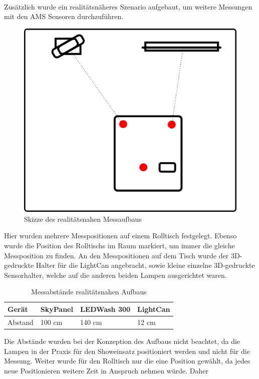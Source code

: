 \documentclass[11pt]{scrartcl}
\begin{document}
\\
Zusätzlich wurde ein realitätsnäheres Szenario aufgebaut, um weitere Messungen mit den AMS Sensoren durchzuführen.
\begin{figure}[H]
    \begin{center}
        \includegraphics[width=.8\textwidth]{images/meassureScenarioRealistic.png}
    \end{center}
    \caption{Skizze des realitätsnahen Messaufbaus} \label{fig:measureScribbleReal}
\end{figure}
\noindent
Hier wurden mehrere Messpositionen auf einem Rolltisch festgelegt. Ebenso wurde die Position des Rolltischs im Raum markiert, um immer die
gleiche Messposition zu finden. An den Messpositionen auf dem Tisch wurde der 3D-gedruckte Halter für die LightCan angebracht, sowie kleine
einzelne 3D-gedruckte Sensorhalter, welche auf die anderen beiden Lampen ausgerichtet waren.
\begin{table}[H]
    \begin{tabularx}{\textwidth}{|l|X|X|X|}
        \hline Gerät  & SkyPanel & LEDWash 300 & LightCan\\\hline
        Abstand       & 100 cm   & 140 cm      & 12 cm   \\\hline
    \end{tabularx}
    \caption{Messabstände realitätsnahen Aufbaus}
\end{table}
\noindent
Die Abstände wurden bei der Konzeption des Aufbaus nicht beachtet, da die Lampen in der Praxis für den Showeinsatz positioniert werden und nicht
für die Messung. Weiter wurde für den Rolltisch nur die eine Position gewählt, da jedes neue Positionieren weitere Zeit in Anspruch nehmen würde. Daher
\end{document}
